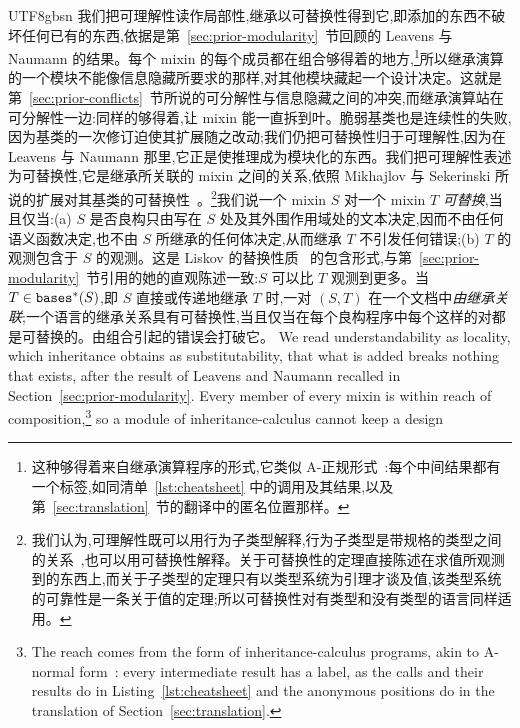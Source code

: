 \begin{CJK*}{UTF8}{gbsn}
\ifPaperChinese
我们把可理解性读作局部性,继承以可替换性得到它,即添加的东西不破坏任何已有的东西,依据是第~\ref{sec:prior-modularity}~节回顾的 Leavens 与 Naumann 的结果。每个 mixin 的每个成员都在组合够得着的地方,\footnote{这种够得着来自继承演算程序的形式,它类似 A-正规形式~\cite{flanagan1993-essence-compiling-continuations}:每个中间结果都有一个标签,如同清单~\ref{lst:cheatsheet} 中的调用及其结果,以及第~\ref{sec:translation}~节的翻译中的匿名位置那样。}所以继承演算的一个模块不能像信息隐藏所要求的那样,对其他模块藏起一个设计决定。这就是第~\ref{sec:prior-conflicts}~节所说的可分解性与信息隐藏之间的冲突,而继承演算站在可分解性一边:同样的够得着,让 mixin 能一直拆到叶。脆弱基类也是连续性的失败,因为基类的一次修订迫使其扩展随之改动;我们仍把可替换性归于可理解性,因为在 Leavens 与 Naumann 那里,它正是使推理成为模块化的东西。我们把可理解性表述为可替换性,它是继承所关联的 mixin 之间的关系,依照 Mikhajlov 与 Sekerinski 所说的扩展对其基类的可替换性~\cite{mikhajlov1998-fragile-base-class}。\footnote{我们认为,可理解性既可以用行为子类型解释,行为子类型是带规格的类型之间的关系~\cite{liskov1994-behavioral-subtyping, leavens2015-behavioral-subtyping-modular-reasoning},也可以用可替换性解释。关于可替换性的定理直接陈述在求值所观测到的东西上,而关于子类型的定理只有以类型系统为引理才谈及值,该类型系统的可靠性是一条关于值的定理;所以可替换性对有类型和没有类型的语言同样适用。}我们说一个 mixin $S$ 对一个 mixin $T$ \emph{可替换},当且仅当:(a) $S$ 是否良构只由写在 $S$ 处及其外围作用域处的文本决定,因而不由任何语义函数决定,也不由 $S$ 所继承的任何体决定,从而继承 $T$ 不引发任何错误;(b) $T$ 的观测包含于 $S$ 的观测。这是 Liskov 的替换性质~\cite{liskov1987-data-abstraction-hierarchy} 的包含形式,与第~\ref{sec:prior-modularity}~节引用的她的直观陈述一致:$S$ 可以比 $T$ 观测到更多。当 $T \in \mathtt{bases}^*(S)$,即 $S$ 直接或传递地继承 $T$ 时,一对 $(S, T)$ 在一个文档中\emph{由继承关联};一个语言的继承关系具有可替换性,当且仅当在每个良构程序中每个这样的对都是可替换的。由组合引起的错误会打破它。
\else
We read understandability as locality, which inheritance obtains as substitutability, that what is
added breaks nothing that exists, after the
result of Leavens and Naumann recalled in Section~\ref{sec:prior-modularity}. Every
member of every mixin is within reach of composition,\footnote{The reach comes from the form of
inheritance-calculus programs, akin to A-normal
form~\cite{flanagan1993-essence-compiling-continuations}: every intermediate result has a label, as the
calls and their results do in Listing~\ref{lst:cheatsheet} and the anonymous positions do in the
translation of Section~\ref{sec:translation}.} so a module of inheritance-calculus cannot keep a design

\end{CJK*}
